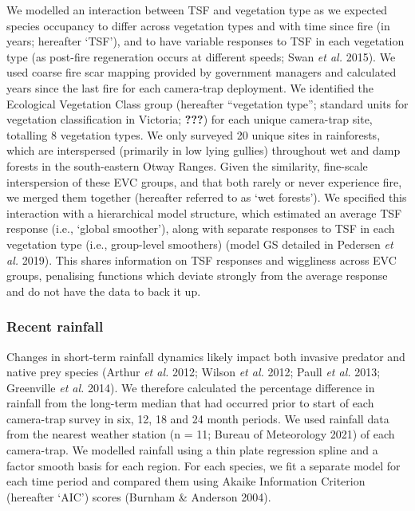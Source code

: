 \documentclass[11pt,a4paper,titlepage,twoside,openright]{style/unimelbthesis}
\begin{document}
\begin{mainmatter}
We modelled an interaction between TSF and vegetation type as we expected species occupancy to differ across vegetation types and with time since fire (in years; hereafter `TSF'), and to have variable responses to TSF in each vegetation type (as post-fire regeneration occurs at different speeds; Swan \emph{et al.} 2015). We used coarse fire scar mapping provided by government managers and calculated years since the last fire for each camera-trap deployment. We identified the Ecological Vegetation Class group (hereafter ``vegetation type''; standard units for vegetation classification in Victoria; {\textbf{???}}) for each unique camera-trap site, totalling 8 vegetation types. We only surveyed 20 unique sites in rainforests, which are interspersed (primarily in low lying gullies) throughout wet and damp forests in the south-eastern Otway Ranges. Given the similarity, fine-scale interspersion of these EVC groups, and that both rarely or never experience fire, we merged them together (hereafter referred to as `wet forests'). We specified this interaction with a hierarchical model structure, which estimated an average TSF response (i.e., `global smoother'), along with separate responses to TSF in each vegetation type (i.e., group-level smoothers) (model GS detailed in Pedersen \emph{et al.} 2019). This shares information on TSF responses and wiggliness across EVC groups, penalising functions which deviate strongly from the average response and do not have the data to back it up.

\hypertarget{recent-rainfall}{%
\subsubsection{Recent rainfall}\label{recent-rainfall}}

Changes in short-term rainfall dynamics likely impact both invasive predator and native prey species (Arthur \emph{et al.} 2012; Wilson \emph{et al.} 2012; Paull \emph{et al.} 2013; Greenville \emph{et al.} 2014). We therefore calculated the percentage difference in rainfall from the long-term median that had occurred prior to start of each camera-trap survey in six, 12, 18 and 24 month periods. We used rainfall data from the nearest weather station (n = 11; Bureau of Meteorology 2021) of each camera-trap. We modelled rainfall using a thin plate regression spline and a factor smooth basis for each region. For each species, we fit a separate model for each time period and compared them using Akaike Information Criterion (hereafter `AIC') scores (Burnham \& Anderson 2004).


\end{mainmatter}
\end{document}
